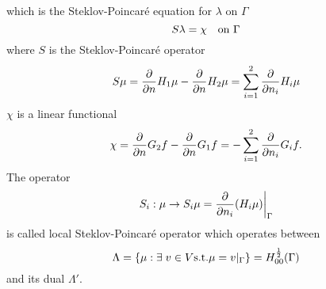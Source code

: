 which is the Steklov-Poincaré equation for \(\lambda\) on \(\Gamma\)
\[
    S\lambda = \chi \quad \text{on }\Gamma
\]
where \(S\) is the Steklov-Poincaré operator 
\[
    S\mu = \pderivative{n}H_1 \mu - \pderivative{n}H_2\mu = \sum_{i=1}^{2}\pderivative{n_i} H_i\mu
\]
\(\chi\) is a linear functional 
\[
    \chi = \pderivative{n} G_2 f -\pderivative{n}G_1 f = -\sum_{i=1}^{2} \pderivative{n_i} G_i f.
\]
The operator 
\[
    S_i : \mu \to S_i\mu = {\pderivative{n_i}(H_i\mu)}\bigg\vert_\Gamma
\]
is called local Steklov-Poincaré operator which operates between 
\[
    \Lambda = \left\{ \mu : \exists \; v \in V \text{s.t.} \mu = v\vert_{\Gamma} \right\} = H^{\frac{1}{2}}_{00}(\Gamma)
\]
and its dual \(\Lambda'\).
